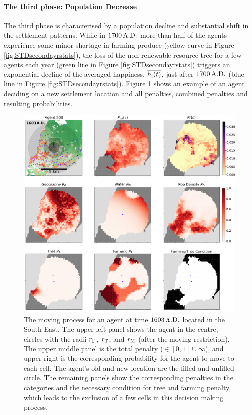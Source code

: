 \paragraph{The third phase: Population Decrease}
The third phase is characterised by a population decline and substantial shift in the settlement patterns.
While in $1700\,{\rm A.D.}$ more than half of the agents experience some minor shortage in farming produce (yellow curve in Figure \ref{fig:STDsecondayrstats}), 
the loss of the non-renewable resource tree for a few agents each year (green line in Figure \ref{fig:STDsecondayrstats}) triggers an exponential decline of the averaged happiness, $\overline{h_{\rm i}(t)}$, just after $1700\, {\rm A.D.}$ (blue line in Figure \ref{fig:STDsecondayrstats}).
Figure \ref{fig:penaltiesag500t1603} shows an example of an agent deciding on a new settlement location and all penalties, combined penalties and resulting probabilities.
\begin{figure}
	\centering
	\includegraphics[width=1.3\linewidth, center]{images/Results/Standard/Penalties_AG500_t=1603}
	\caption{The moving process for an agent at time $1603\, {\rm A.D.}$ located in the South East. The upper left panel shows the agent in the centre, circles with the radii $r_{\rm F}$, $r_{\rm T}$, and $r_{\rm M}$ (after the moving restriction). The upper middle panel is the total penalty ($\in [0,1]\cup \infty$), and upper right is the corresponding probability for the agent to move to each cell. The agent's old and new location are the filled and unfilled circle. The remaining panels show the corresponding penalties in the categories and the necessary condition for tree and farming penalty, which leads to the exclusion of a few cells in this decision making process.}
	\label{fig:penaltiesag500t1603}
\end{figure}
